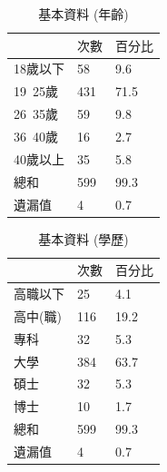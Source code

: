 \begin{table}[htb]
\caption{基本資料 (年齡)}
\label{tab:PL2}
\renewcommand{\arraystretch}{1.2} %
\arrayrulewidth=1pt               %
\tabcolsep=18pt                   %
%
\begin{tabular}[t]{lll}  %
\hline
 & $次數$ & $百分比$ \\
\hline
18歲以下        & 58  & 9.6 \\
19~25歲        & 431  & 71.5 \\
26~35歲        & 59  & 9.8 \\
36~40歲        & 16  &2.7\\
40歲以上        & 35  & 5.8 \\
總和               & 599  & 99.3 \\
遺漏值            & 4 & 0.7 \\
\hline
\end{tabular}
\end{table}

\begin{table}[htb]
\caption{基本資料 (學歷)}
\label{tab:PL3}
\renewcommand{\arraystretch}{1.2} %
\arrayrulewidth=1pt               %
\tabcolsep=18pt                   %
%
\begin{tabular}[t]{lll}  %
\hline
 & $次數$ & $百分比$ \\
\hline
高職以下       & 25  & 4.1 \\
高中(職)        & 116  & 19.2 \\
專科        & 32  & 5.3 \\
大學        & 384 &63.7\\
碩士        & 32  & 5.3 \\
博士           & 10  & 1.7 \\
總和           & 599  & 99.3 \\
遺漏值            & 4 & 0.7 \\
\hline
\end{tabular}
\end{table}

